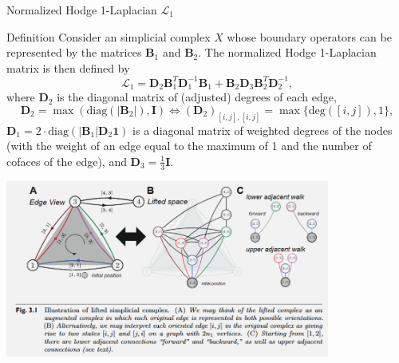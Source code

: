 \documentclass[aspectratio=169,xcolor=dvipsnames]{beamer}
\def\D{\boldsymbol{D}}
\begin{document}
\begin{frame}{Normalized Hodge 1-Laplacian $\mathcal{L}_1$}
    \begin{block}{Definition}
Consider an simplicial complex $X$ whose boundary operators can be represented by the matrices $\boldsymbol{B}_1$ and $\boldsymbol{B}_2$. The normalized Hodge 1-Laplacian matrix is then defined by
\begin{equation}
\mathcal{L}_1 = \D_2 \boldsymbol{B}_1^{T} \D_1^{-1} \boldsymbol{B}_1 + \boldsymbol{B}_2 \D_3 \boldsymbol{B}_2^{T} \D_2^{-1},
\end{equation}
where $\D_2$ is the diagonal matrix of (adjusted) degrees of each edge,
\begin{equation}
\D_2 = \max(\text{diag}(|\boldsymbol{B}_2|), \boldsymbol{I}) \Leftrightarrow (\D_2)_{[i,j],[i,j]} = \max\{\text{deg}([i,j]), 1\},
\end{equation}
$\D_1 = 2 \cdot \text{diag}(|\boldsymbol{B}_1| \D_2 \boldsymbol{1})$ is a diagonal matrix of weighted degrees of the nodes (with the weight of an edge equal to the maximum of 1 and the number of cofaces of the edge), and $\D_3 = \frac{1}{3}\boldsymbol{I}$.
\end{block}
\end{frame}

\begin{frame}
    \begin{center}
        \includegraphics[width=0.8\textwidth]{lifted_complex.png}
    \end{center}
\end{frame}
\end{document}
